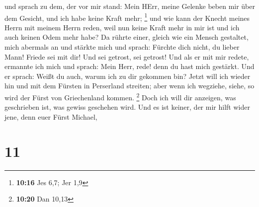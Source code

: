 und sprach zu dem, der vor mir stand: Mein HErr, meine Gelenke beben mir
über dem Gesicht, und ich habe keine Kraft mehr; \footnote{\textbf{10:16}
  Jes 6,7; Jer 1,9}  und wie kann der Knecht meines Herrn
mit meinem Herrn reden, weil nun keine Kraft mehr in mir ist und ich
auch keinen Odem mehr habe?  Da rührte einer, gleich wie
ein Mensch gestaltet, mich abermals an und stärkte mich 
und sprach: Fürchte dich nicht, du lieber Mann! Friede sei mit dir! Und
sei getrost, sei getrost! Und als er mit mir redete, ermannte ich mich
und sprach: Mein Herr, rede! denn du hast mich gestärkt. 
Und er sprach: Weißt du auch, warum ich zu dir gekommen bin? Jetzt will
ich wieder hin und mit dem Fürsten in Perserland streiten; aber wenn ich
wegziehe, siehe, so wird der Fürst von Griechenland kommen. \footnote{\textbf{10:20}
  Dan 10,13}  Doch ich will dir anzeigen, was geschrieben
ist, was gewiss geschehen wird. Und es ist keiner, der mir hilft wider
jene, denn euer Fürst Michael,

\hypertarget{section-10}{%
\section{11}\label{section-10}}

